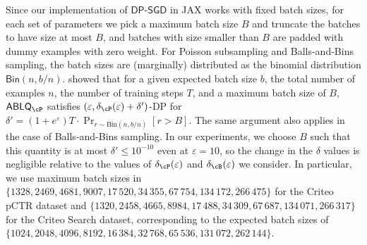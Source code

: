 \documentclass[twoside]{article}
\theoremstyle{definition}
\newcommand{\eps}{\varepsilon}
\newcommand{\BnB}{Balls-and-Bins\xspace}
\newcommand{\DPSGD}{\mathsf{DP}\text{-}\mathsf{SGD}}
\newcommand{\ABLQ}{\mathsf{ABLQ}}
\newcommand{\ABLQP}{\ABLQ_{\cP}}
\newcommand{\deltaP}{\delta_{\cP}}
\newcommand{\deltaB}{\delta_{\cB}}
\begin{document}
Since our implementation of $\DPSGD$ in JAX works with fixed batch sizes, for each set of parameters we pick a maximum batch size $B$ and truncate the batches to have size at most $B$, and batches with size smaller than $B$ are padded with dummy examples with zero weight.
For Poisson subsampling and \BnB sampling, the batch sizes are (marginally) distributed as the binomial distribution $\mathsf{Bin}(n, b/n)$.
\citet[Proposition 3.2, Theorem 3.3]{chua24scalable} showed that for a given expected batch size $b$, the total number of examples $n$, the number of training steps $T$, and a maximum batch size of $B$, $\ABLQP$ satisfies $(\eps, \deltaP(\eps) + \delta')$-DP for $\delta' = (1 + e^\eps) T \cdot \Pr_{r \sim \mathrm{Bin}(n, b/n)}[r > B]$. The same argument also applies in the case of \BnB sampling.
In our experiments, we choose $B$ such that this quantity is at most
$\delta' \le 10^{-10}$ even at $\eps = 10$, so the change in the $\delta$ values is negligible relative to the values of $\deltaP(\eps)$ and $\deltaB(\eps)$ we consider.
In particular, we use maximum batch sizes in $\{1328, 2469, 4681, 9007, 17\,520, 34\,355, 67\,754, 134\,172, 266\,475\}$ for the Criteo pCTR dataset and $\{1320, 2458, 4665, 8984, 17\,488, 34\,309, 67\,687, 134\,071, 266\,317\}$ for the Criteo Search dataset, corresponding to the expected batch sizes of $\{1024, 2048, 4096, 8192, 16\,384, 32\,768, 65\,536, 131\,072, 262\,144\}$.
\end{document}
